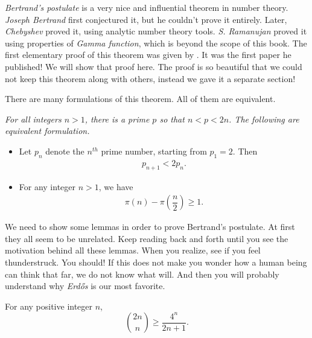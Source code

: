 \documentclass{subfile}
\begin{document}
	\label{sec:bertrandspostulate}
	\textit{Bertrand's postulate} is a very nice and influential theorem in number theory. \textit{Joseph Bertrand} first conjectured it, but he couldn't prove it entirely. Later, \textit{Chebyshev} proved it, using analytic number theory tools. \textit{S. Ramanujan} \textcite{meher_murty_2013} proved it using properties of \textit{Gamma function}, which is beyond the scope of this book. The first elementary proof of this theorem was given by \textcite{erdos_1932}. It was the first paper he published! We will show that proof here. The proof is so beautiful that we could not keep this theorem along with others, instead we gave it a separate section!

	There are many formulations of this theorem. All of them are equivalent.

	\begin{theorem}\label{thm:bertrand}\slshape
		For all integers $n>1$, there is a prime $p$ so that $n<p<2n$. The following are equivalent formulation.
		\begin{itemize}
			\item Let $p_n$ denote the $n^{th}$ prime number, starting from $p_1=2$. Then
			\begin{eqnarray*}
				p_{n+1} <2p_n.
			\end{eqnarray*}
			\item For any integer $n >1$, we have
			\begin{eqnarray*}
				\pi(n)-\pi\left(\dfrac{n}{2}\right)\geq1.
			\end{eqnarray*}
		\end{itemize}
	\end{theorem}

	We need to show some lemmas in order to prove Bertrand's postulate. At first they all seem to be unrelated. Keep reading back and forth until you see the motivation behind all these lemmas. When you realize, see if you feel thunderstruck. You should! If this does not make you wonder how a human being can think that far, we do not know what will. And then you will probably understand why \textit{Erd\H {o}s} is our most favorite.

	\begin{lemma}\label{lem:bertrand1}
		For any positive integer $n$,
		\[\binom{2n}{n}\geq\dfrac{4^n}{2n+1}.\]
	\end{lemma}
\end{document}
